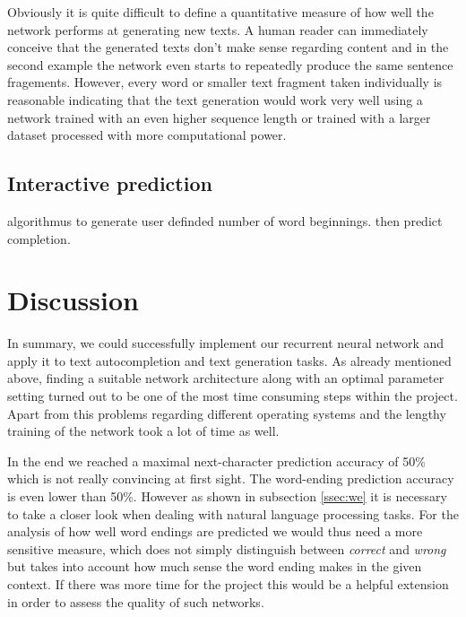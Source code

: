 \documentclass[11pt,a4paper,bibliography=totocnumbered,listof=totocnumbered]{scrartcl}
\begin{document}
Obviously it is quite difficult to define a quantitative measure of how well the network performs at generating new texts. A human reader can immediately conceive that the generated texts don't make sense regarding content and in the second example the network even starts to repeatedly produce the same sentence fragements. However, every word or smaller text fragment taken individually is reasonable indicating that the text generation would work very well using a network trained with an even higher sequence length or trained with a larger dataset processed with more computational power.


\subsection{Interactive prediction}
algorithmus to generate user definded number of word beginnings. then predict completion.

\pagebreak
\section{Discussion}
In summary, we could successfully implement our recurrent neural network and apply it to text autocompletion and text generation tasks. As already mentioned above, finding a suitable network architecture along with an optimal parameter setting turned out to be one of the most time consuming steps within the project. Apart from this problems regarding different operating systems and the lengthy training of the network took a lot of time as well. 

In the end we reached a maximal next-character prediction accuracy of 50\% which is not really convincing at first sight. The word-ending prediction accuracy is even lower than 50\%. However as shown in subsection \ref{ssec:we} it is necessary to take a closer look when dealing with natural language processing tasks. For the analysis of how well word endings are predicted we would thus need a more sensitive measure, which does not simply distinguish between \textit{correct} and \textit{wrong} but takes into account how much sense the word ending makes in the given context. If there was more time for the project this would be a helpful extension in order to assess the quality of such networks. 
\end{document}
